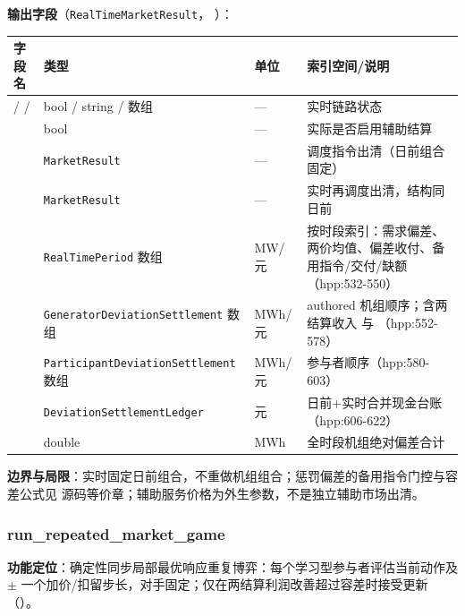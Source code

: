 \textbf{输出字段}（\texttt{RealTimeMarketResult}，
）：
\begin{center}\footnotesize
\begin{longtable}{@{}L{4.6cm}L{3.4cm}L{1.7cm}L{5.6cm}@{}}
\toprule 字段名 & 类型 & 单位 & 索引空间/说明\\\midrule
\endhead
{} /  /  & bool / string / 数组 & — & 实时链路状态\\
 & bool & — & 实际是否启用辅助结算\\
 & \texttt{MarketResult} & — & 调度指令出清（日前组合固定）\\
 & \texttt{MarketResult} & — & 实时再调度出清，结构同日前\\
 & \texttt{RealTimePeriod} 数组 & MW/元 & 按时段索引：需求偏差、两价均值、偏差收付、备用指令/交付/缺额（hpp:532-550）\\
 & \texttt{Generator\allowbreak Deviation\allowbreak Settlement} 数组 & MWh/元 & authored 机组顺序；含两结算收入  与 （hpp:552-578）\\
 & \texttt{Participant\allowbreak Deviation\allowbreak Settlement} 数组 & MWh/元 & 参与者顺序（hpp:580-603）\\
 & \texttt{Deviation\allowbreak Settlement\allowbreak Ledger} & 元 & 日前+实时合并现金台账（hpp:606-622）\\
 & double & MWh & 全时段机组绝对偏差合计\\
\bottomrule
\end{longtable}
\end{center}

\textbf{边界与局限}：实时固定日前组合，不重做机组组合；惩罚偏差的备用指令门控与容差公式见
源码等价章；辅助服务价格为外生参数，不是独立辅助市场出清。

\subsubsection{run\_repeated\_market\_game}
\textbf{功能定位}：确定性同步局部最优响应重复博弈：每个学习型参与者评估当前动作及
$\pm$ 一个加价/扣留步长，对手固定；仅在两结算利润改善超过容差时接受更新
（）。

